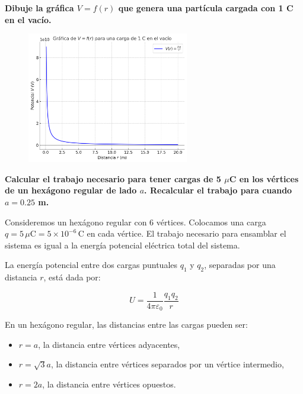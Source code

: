 \documentclass[answers]{exam} %
\begin{document}
\begin{questions}
	\newpage

	\vspace{0.5cm}
	\question \large\textbf{Dibuje la gráfica $V = f(r)$ que genera una partícula cargada con 1 C en el vacío.}

	\begin{figure}[h!]
		\centering
		\includegraphics[width=0.63\textwidth]{./public/g1.png}
	\end{figure}

	\vspace{0.5cm}

	\question \large\textbf{Calcular el trabajo necesario para tener cargas de 5 $\mu$C en los vértices de un hexágono regular de lado $a$. Recalcular el trabajo para cuando $a = 0.25$ m.}

	Consideremos un hexágono regular con 6 vértices. Colocamos una carga \( q = 5 \, \mu\text{C} = 5 \times 10^{-6} \, \text{C} \) en cada vértice. El trabajo necesario para ensamblar el sistema es igual a la energía potencial eléctrica total del sistema.

	La energía potencial entre dos cargas puntuales \( q_1 \) y \( q_2 \), separadas por una distancia \( r \), está dada por:

	\[
		U = \frac{1}{4 \pi \varepsilon_0} \frac{q_1 q_2}{r}
	\]

	En un hexágono regular, las distancias entre las cargas pueden ser:
	\begin{itemize}
		\item \( r = a \), la distancia entre vértices adyacentes,
		\item \( r = \sqrt{3}a \), la distancia entre vértices separados por un vértice intermedio,
		\item \( r = 2a \), la distancia entre vértices opuestos.
	\end{itemize}



\end{questions}
\end{document}
